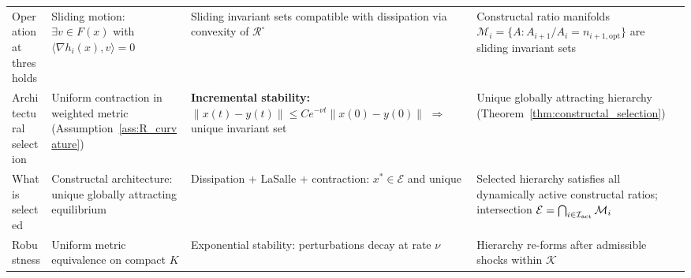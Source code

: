 \documentclass[12pt]{article}
\theoremstyle{plain}
\theoremstyle{definition}
\theoremstyle{remark}
\newcommand{\opt}{\mathrm{opt}}
\begin{document}
\begin{table}[H]
{\begin{tabular}{p{3.2cm} p{4.4cm} p{4.6cm} p{4.6cm}}
Operation at thresholds
&
Sliding motion:
$\exists v\in F(x)$ with
$\langle\nabla h_i(x),v\rangle=0$
&
Sliding invariant sets compatible with
dissipation via convexity of
$\mathcal R^\circ$
&
Constructal ratio manifolds
$\mathcal M_i=\{A: A_{i+1}/A_i=n_{i+1,\opt}\}$
are sliding invariant sets \\

Architectural selection
&
Uniform contraction in weighted metric
(Assumption~\ref{ass:R_curvature})
&
\textbf{Incremental stability:}
$\|x(t)-y(t)\|\le Ce^{-\nu t}\|x(0)-y(0)\|$
$\Rightarrow$ unique invariant set
&
Unique globally attracting hierarchy
(Theorem~\ref{thm:constructal_selection}) \\

What is selected
&
Constructal architecture:
unique globally attracting equilibrium
&
Dissipation + LaSalle + contraction:
$x^\ast\in\mathcal E$ and unique
&
Selected hierarchy satisfies
all dynamically active constructal ratios;
intersection
$\mathcal E=\bigcap_{i\in\mathcal I_{\rm act}}\mathcal M_i$ \\

Robustness
&
Uniform metric equivalence on compact $K$
&
Exponential stability:
perturbations decay at rate $\nu$
&
Hierarchy re-forms after admissible shocks
within $\mathcal K$ \\

\bottomrule
\end{tabular}%
}
\end{table}
\end{document}
